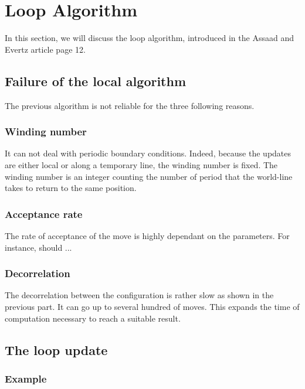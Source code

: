 \documentclass[a4paper,12pt]{article}
\begin{document}
	\newpage
	\section{Loop Algorithm}
	In this section, we will discuss the loop algorithm, introduced in the Assaad and Evertz article page 12. 
	
	\subsection{Failure of the local algorithm}
	The previous algorithm is not reliable for the three following reasons.
	
	\subsubsection{Winding number}
	It can not deal with periodic boundary conditions. Indeed, because the updates are either local or along a temporary line, the winding number is fixed. The winding number is an integer counting the number of period that the world-line takes to return to the same position.

	\subsubsection{Acceptance rate} The rate of acceptance of the move is highly dependant on the parameters. For instance, should ...
	
	\subsubsection{Decorrelation} The decorrelation between the configuration is rather slow as shown in the previous part. It can go up to several hundred of moves. This expands the time of computation necessary to reach a suitable result. 

	\subsection{The loop update}
	
	\subsubsection{Example}
	
\end{document}
